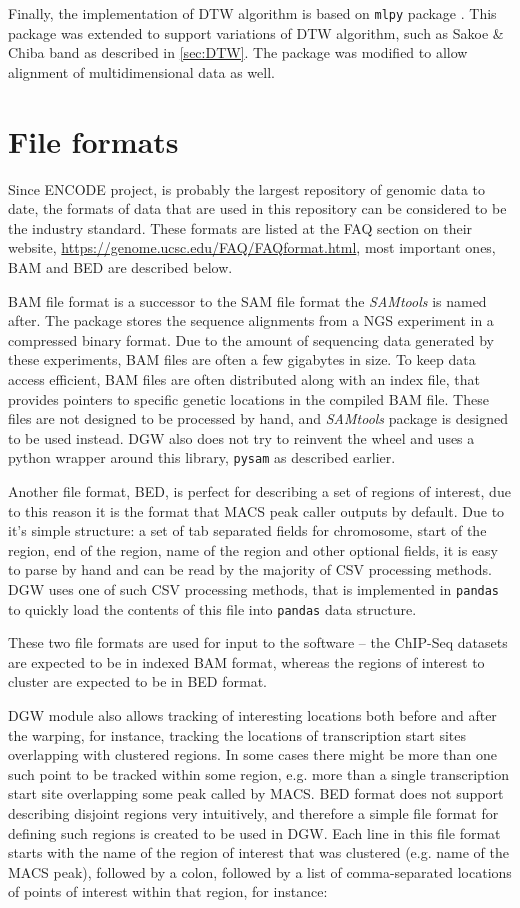 \documentclass[parskip]{cs4rep}
\newcommand{\pythonpackage}[1]{{\tt #1}}
\begin{document}
Finally, the implementation of DTW algorithm is based on \pythonpackage{mlpy} package \cite{Albanese:2012vf}. This package was extended to support variations of DTW algorithm, such as Sakoe \& Chiba band as described in \autoref{sec:DTW}. The package was modified to allow alignment of multidimensional data as well.
\section{File formats}
Since ENCODE project, \cite{Rosenbloom:2011gw} is probably the largest repository of genomic data to date, the formats of data that are used in this repository can be considered to be the industry standard. These formats are listed at the FAQ section on their website, \url{https://genome.ucsc.edu/FAQ/FAQformat.html}, most important ones, BAM and BED are described below.

BAM file format is a successor to the SAM file format the \emph{SAMtools} is named after. The package stores the sequence alignments from a NGS experiment in a compressed binary format. Due to the amount of sequencing data generated by these experiments, BAM files are often a few gigabytes in size. 
To keep data access efficient, BAM files are often distributed along with an index file, that provides pointers to specific genetic locations in the compiled BAM file. These files are not designed to be processed by hand, and \emph{SAMtools} package is designed to be used instead. DGW also does not try to reinvent the wheel and uses a python wrapper around this library, \pythonpackage{pysam} as described earlier.

Another file format, BED, is perfect for describing a set of regions of interest, due to this reason it is the format that MACS peak caller outputs by default. Due to it's simple structure: a set of tab separated fields for chromosome, start of the region, end of the region, name of the region and other optional fields, it is easy to parse by hand and can be read by the majority of CSV processing methods.
DGW uses one of such CSV processing methods, that is implemented in \pythonpackage{pandas} to quickly load the contents of this file into \pythonpackage{pandas} data structure.

These two file formats are used for input to the software -- the ChIP-Seq datasets are expected to be in indexed BAM format, whereas the regions of interest to cluster are expected to be in BED format.

DGW module also allows tracking of interesting locations both before and after the warping, for instance, tracking the locations of transcription start sites overlapping with clustered regions. In some cases there might be more than one such point to be tracked within some region, e.g. more than a single transcription start site overlapping some peak called by MACS. BED format does not support describing disjoint regions very intuitively, and therefore a simple file format for defining such regions is created to be used in DGW. Each line in this file format starts with the name of the region of interest that was clustered (e.g. name of the MACS peak), followed by a colon, followed by a list of comma-separated locations of points of interest within that region, for instance:
\end{document}
